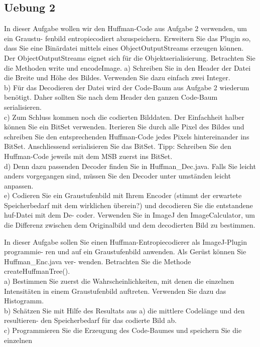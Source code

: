 \documentclass[10pt]{article}
\begin{document}
\subsection{Uebung 2}
In dieser Aufgabe wollen wir den Huffman-Code aus Aufgabe 2 verwenden, um ein Graustu-
fenbild entropiecodiert abzuspeichern. Erweitern Sie das Plugin so, dass Sie eine Binärdatei
mittels eines ObjectOutputStreams erzeugen können. Der ObjectOutputStreams eignet
sich für die Objektserialisierung. Betrachten Sie die Methoden write und encodeImage.
a) Schreiben Sie in den Header der Datei die Breite und Höhe des Bildes. Verwenden Sie
dazu einfach zwei Integer.\\
b) Für das Decodieren der Datei wird der Code-Baum aus Aufgabe 2 wiederum benötigt.
Daher sollten Sie nach dem Header den ganzen Code-Baum serialisieren.\\
c) Zum Schluss kommen noch die codierten Bilddaten. Der Einfachheit halber können Sie
ein BitSet verwenden. Iterieren Sie durch alle Pixel des Bildes und schreiben Sie den
entsprechenden Huffman-Code jedes Pixels hintereinander ins BitSet. Anschliessend
serialisieren Sie das BitSet. Tipp: Schreiben Sie den Huffman-Code jeweils mit dem
MSB zuerst ins BitSet.\\
d) Denn dazu passenden Decoder finden Sie in Huffman\_Dec.java. Falls Sie leicht anders
vorgegangen sind, müssen Sie den Decoder unter umständen leicht anpassen.\\
e) Codieren Sie ein Graustufenbild mit Ihrem Encoder (stimmt der erwartete Speicherbedarf
mit dem wirklichen überein?) und decodieren Sie die entstandene huf-Datei mit dem De-
coder. Verwenden Sie in ImageJ den ImageCalculator, um die Differenz zwischen dem
Originalbild und dem decodierten Bild zu bestimmen.

In dieser Aufgabe sollen Sie einen Huffman-Entropiecodierer als ImageJ-Plugin programmie-
ren und auf ein Graustufenbild anwenden. Als Gerüst können Sie Huffman\_Enc.java ver-
wenden. Betrachten Sie die Methode createHuffmanTree().\\
a) Bestimmen Sie zuerst die Wahrscheinlichkeiten, mit denen die einzelnen Intensitäten in
einem Graustufenbild auftreten. Verwenden Sie dazu das Histogramm.\\
b) Schätzen Sie mit Hilfe des Resultats aus a) die mittlere Codelänge und den resultieren-
den Speicherbedarf für das codierte Bild ab.\\
c) Programmieren Sie die Erzeugung des Code-Baumes und speichern Sie die einzelnen
\end{document}
